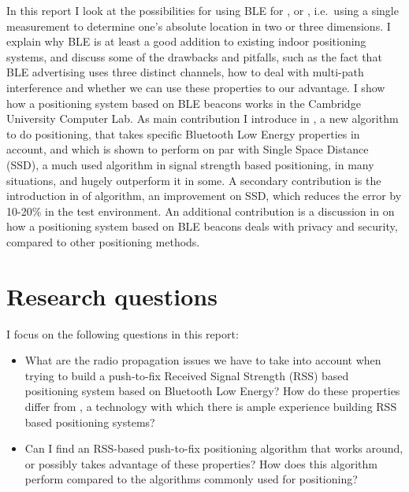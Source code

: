 In this report I look at the possibilities for using BLE for , or , i.e.\ using a single measurement to determine one's absolute location in two or three dimensions.
I explain why BLE is at least a good addition to existing indoor positioning systems, and discuss some of the drawbacks and pitfalls, such as the fact that BLE advertising uses three distinct channels, how to deal with multi-path interference and whether we can use these properties to our advantage.
I show how a positioning system based on BLE beacons works in the Cambridge University Computer Lab.
As main contribution I introduce  in , a new algorithm to do positioning, that takes specific Bluetooth Low Energy properties in account, and which is shown to perform on par with Single Space Distance (SSD), a much used algorithm in signal strength based positioning, in many situations, and hugely outperform it in some.
A secondary contribution is the introduction in  of  algorithm, an improvement on SSD, which reduces the error by 10-20\% in the test environment.
An additional contribution is a discussion in  on how a positioning system based on BLE beacons deals with privacy and security, compared to other positioning methods.

\section{Research questions}
I focus on the following questions in this report:
\begin{itemize}
    \item What are the radio propagation issues we have to take into account when trying to build a push-to-fix Received Signal Strength (RSS) based positioning system based on Bluetooth Low Energy? How do these properties differ from \wifi, a technology with which there is ample experience building RSS based positioning systems?
    \item Can I find an RSS-based push-to-fix positioning algorithm that works around, or possibly takes advantage of these properties? How does this algorithm perform compared to the algorithms commonly used for \wifi positioning?
\end{itemize}
